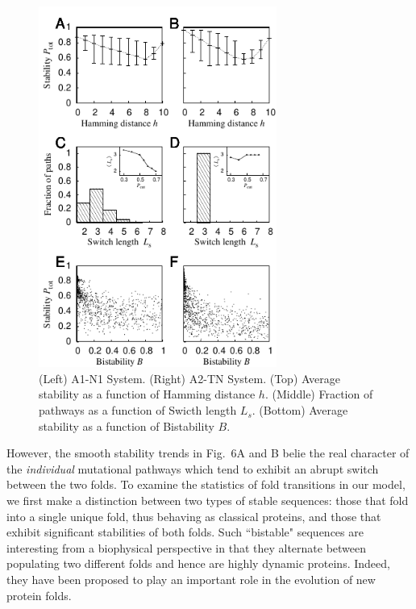 \documentclass[%
 aip,
rsi,%
 amsmath,amssymb,
 reprint,%
]{revtex4-1}
\begin{document}
\begin{figure}
\includegraphics[width=7.8cm]{Paths}
\caption{(Left) A1-N1 System. (Right) A2-TN System. (Top) Average stability as a function of Hamming distance $h$. (Middle) Fraction of pathways as a function of Swicth length $L_s$. (Bottom) Average stability as a function of Bistability $B$.}
\end{figure}


However, the smooth stability trends in Fig.~6A and B belie the real character of the \textit{individual} mutational pathways which tend to exhibit an abrupt switch between the two folds. To examine the statistics of fold transitions in our model, we first make a distinction between two types of stable sequences: those that fold into a single unique fold, thus behaving as classical proteins, and those that exhibit significant stabilities of both folds. Such ``bistable" sequences are interesting from a biophysical perspective in that they alternate between populating two different folds and hence are highly dynamic proteins. Indeed, they have been proposed to play an important role in the evolution of new protein folds.~\cite{Sikosek2016} 
\end{document}
